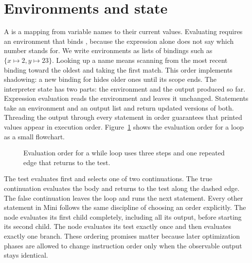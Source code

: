 \section{Environments and state}
\label{sec:ch02-environments}

A  is a mapping from variable names to their current values.
Evaluating  requires an environment that binds , because the expression alone does not say which number  stands for.
We write environments as lists of bindings such as $\{x \mapsto 2, y \mapsto 23\}$.
Looking up a name means scanning from the most recent binding toward the oldest and taking the first match.
This order implements shadowing: a new binding for  hides older ones until its scope ends.
The interpreter state has two parts: the environment and the output produced so far.
Expression evaluation reads the environment and leaves it unchanged.
Statements take an environment and an output list and return updated versions of both.
Threading the output through every statement in order guarantees that printed values appear in execution order.
Figure~\ref{fig:ch02-eval-while} shows the evaluation order for a loop as a small flowchart.
\begin{figure}
\centering
{}
\caption{Evaluation order for a while loop uses three steps and one repeated edge that returns to the test.}
\label{fig:ch02-eval-while}
\end{figure}
The test evaluates first and selects one of two continuations.
The true continuation evaluates the body and returns to the test along the dashed edge.
The false continuation leaves the loop and runs the next statement.
Every other statement in Mini follows the same discipline of choosing an order explicitly.
The  node evaluates its first child completely, including all its output, before starting its second child.
The  node evaluates its test exactly once and then evaluates exactly one branch.
These ordering promises matter because later optimization phases are allowed to change instruction order only when the observable output stays identical.

